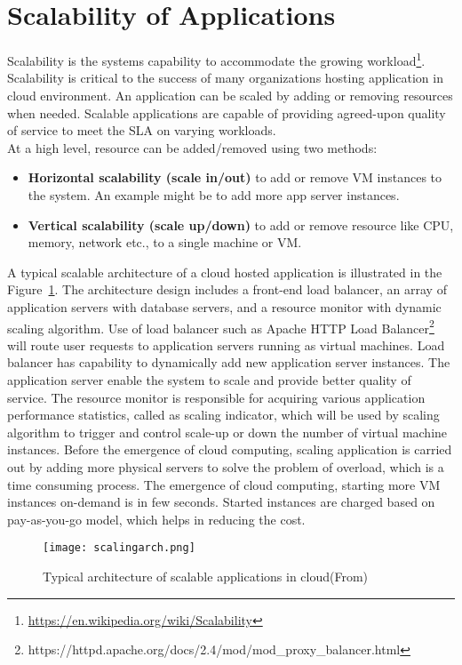 \section{Scalability of Applications}
\label{sec:ScalableSystems}
Scalability is the systems capability to accommodate the growing workload\footnote{\url{https://en.wikipedia.org/wiki/Scalability}}. Scalability is critical to the success of many organizations hosting application in cloud environment. An application can be scaled by adding or removing resources when needed. Scalable applications are capable of providing agreed-upon quality of service to meet the SLA on varying workloads.
\\
At a high level, resource can be added/removed using two methods:
\begin{itemize}
  \item \textbf{Horizontal scalability (scale in/out)} to add or remove VM instances to the system. An example might be to add more app server instances\cite{galante2012survey}.
  \item \textbf{Vertical scalability (scale up/down)} to add or remove resource like CPU, memory, network etc., to a single machine or VM\cite{galante2012survey}.
\end{itemize}
A typical scalable architecture of a cloud hosted application\cite{chieu2009dynamic} is illustrated in the Figure~\ref{figure:scalingarch}. The architecture design includes a front-end load balancer, an array of application servers with database servers, and a resource monitor with dynamic scaling algorithm. Use of load balancer such as Apache HTTP Load Balancer\footnote{https://httpd.apache.org/docs/2.4/mod/mod\_proxy\_balancer.html} will route user requests to application servers running as virtual machines. Load balancer has capability to dynamically add new application server instances. The application server enable the system to scale and provide better quality of service. The resource monitor is responsible for acquiring various application performance statistics, called as scaling indicator\cite{chieu2011dynamic}, which will be used by scaling algorithm to trigger and control scale-up or down the number of virtual machine instances. Before the emergence of cloud computing, scaling application is carried out by adding more physical servers to solve the problem of overload, which is a time consuming process. The emergence of cloud computing, starting more VM instances on-demand is in few seconds. Started instances are charged based on pay-as-you-go model, which helps in reducing the cost.
\begin{figure}[h]
  \begin{center}
    \texttt{[image: scalingarch.png]}
    \caption{Typical architecture of scalable applications in cloud(From\cite{chieu2009dynamic})}
    \label{figure:scalingarch}
  \end{center}
\end{figure}

